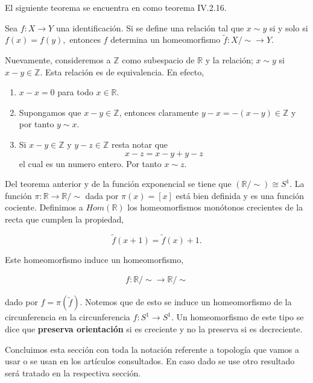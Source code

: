 El siguiente teorema se encuentra en \cite{top_prieto} como teorema IV.2.16.

\begin{te} 
Sea $f:X \to Y$ una identificación. Si se define una relación tal que $x \sim y$ si y solo si $f(x)=f(y),$ entonces $f$ determina un homeomorfismo $\tilde{f}:X/ \sim \to Y.$
\end{te}


\begin{ej}\label{ej:Cir_un_coc}
Nuevamente, consideremos a $\mathbb{Z}$ como subespacio de $\mathbb{R}$ y la relación; $x \sim y$ si $x-y \in \mathbb{Z}$. Esta relación es de equivalencia. En efecto, 

\begin{enumerate}
	\item $x-x=0 $ para todo $x \in \mathbb{R}$.
	\item Supongamos que $x-y \in \mathbb{Z}$, entonces claramente $y-x=-(x-y) \in \mathbb{Z}$ y por tanto $y \sim x$.
	\item Si $x-y \in \mathbb{Z}$ y $y-z \in \mathbb{Z}$ resta notar que $$x-z=x-y+y-z$$
el cual es un numero entero. Por tanto $x \sim z$.
	\end{enumerate}


Del teorema anterior y de la función exponencial se tiene que $(\mathbb{R}/\sim) \cong S^1.$ La función  $\pi: \mathbb{R} \to \mathbb{R}/ \sim$ dada por $\pi (x)=[x]$ está bien definida y es una función cociente. Definimos a $Hom(\mathbb{R})$ los homeomorfismos monótonos crecientes de la recta que cumplen la propiedad, 

$$\tilde{f}(x+1)= \tilde{f}(x)+1.$$

Este homeomorfismo induce un homeomorfismo,

\begin{align*}
f:\mathbb{R}/ \sim \to  \mathbb{R}/ \sim
\end{align*}
 
dado por $f=\pi(\tilde{f}).$ Notemos que de esto se induce un homeomorfismo de la circunferencia en la circunferencia $f:S^1 \to S^1$. Un homeomorfismo de este tipo se dice que \textbf{preserva orientación} si es creciente y no la preserva si es decreciente. 
\end{ej}

Concluimos esta sección con toda la notación referente a topología que vamos a usar o se usan en los artículos consultados. En caso dado se use otro resultado será tratado en la respectiva sección. 


